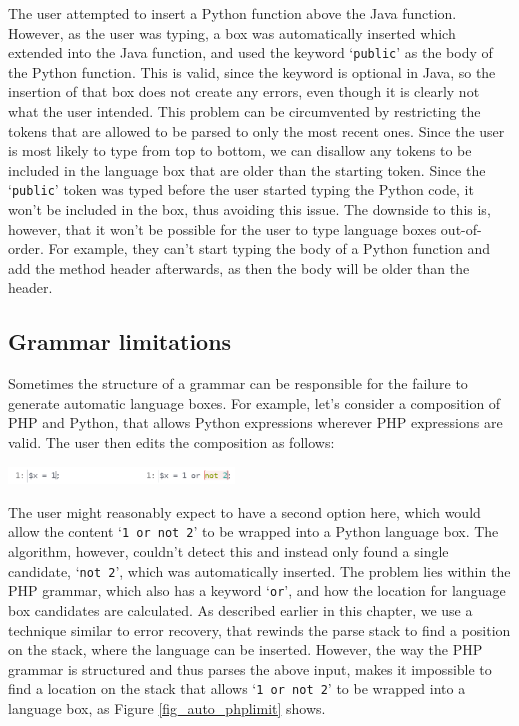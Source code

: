\documentclass[sigplan,screen]{acmart}\settopmatter{printfolios=true,printccs=false,printacmref=false}
\newcommand{\qtt}[1]{`\texttt{#1}'\xspace}
\begin{document}
The user attempted to insert a Python function above the Java function.
However, as the user was typing, a box was automatically inserted which
extended into the Java function, and used the keyword \qtt{public} as the body
of the Python function.  This is valid, since the keyword is optional in Java,
so the insertion of that box does not create any errors, even though it is
clearly not what the user intended.
This problem can be circumvented by restricting the tokens that are allowed to
be parsed to only the most recent ones. Since the user is most likely to type
from top to bottom, we can disallow any tokens to be included in the language
box that are older than the starting token. Since the \qtt{public} token was
typed before the user started typing the Python code, it won't be included in
the box, thus avoiding this issue. The downside to this is, however, that it won't be possible for
the user to type language boxes out-of-order.  For example, they can't start
typing the body of a Python function and add the method header afterwards, as
then the body will be older than the header.

\subsection{Grammar limitations}

Sometimes the structure of a grammar can be responsible for the failure to
generate automatic language boxes. For example, let's consider a composition of
PHP and Python, that allows Python expressions wherever PHP expressions are
valid. The user then edits the composition as follows:

\begin{center}
\includegraphics[width=0.45\textwidth]{images/autobox_limitphpgrammar.png}
\end{center}

The user might reasonably expect to have a second option here, which would
allow the content \qtt{1 or not 2} to be wrapped into a Python language box.
The algorithm, however, couldn't detect this and instead only found a single
candidate, \qtt{not 2}, which was automatically inserted.  The problem lies
within the PHP grammar, which also has a keyword \qtt{or}, and how the location
for language box candidates are calculated. As described earlier in this
chapter, we use a technique similar to error recovery, that rewinds the parse
stack to find a position on the stack, where the language can be inserted.
However, the way the PHP grammar is structured and thus parses the above input,
makes it impossible to find a location on the stack that allows \qtt{1 or not
2} to be wrapped into a language box, as Figure \ref{fig_auto_phplimit} shows.
\end{document}
